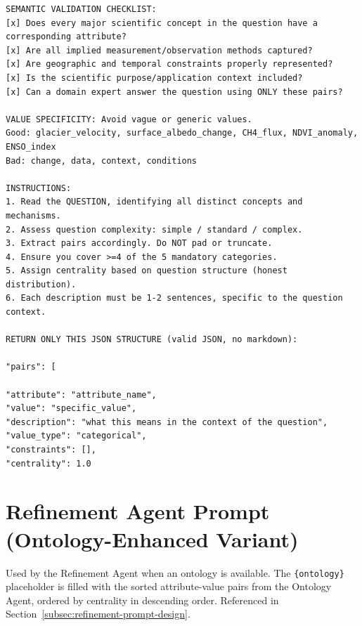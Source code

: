 \begin{lstlisting}[style=promptstyle,
caption={Ontology Agent extraction prompt (full).},
label={lst:ontology-prompt}]
SEMANTIC VALIDATION CHECKLIST:
[x] Does every major scientific concept in the question have a corresponding attribute?
[x] Are all implied measurement/observation methods captured?
[x] Are geographic and temporal constraints properly represented?
[x] Is the scientific purpose/application context included?
[x] Can a domain expert answer the question using ONLY these pairs?

VALUE SPECIFICITY: Avoid vague or generic values.
Good: glacier_velocity, surface_albedo_change, CH4_flux, NDVI_anomaly, ENSO_index
Bad: change, data, context, conditions

INSTRUCTIONS:
1. Read the QUESTION, identifying all distinct concepts and mechanisms.
2. Assess question complexity: simple / standard / complex.
3. Extract pairs accordingly. Do NOT pad or truncate.
4. Ensure you cover >=4 of the 5 mandatory categories.
5. Assign centrality based on question structure (honest distribution).
6. Each description must be 1-2 sentences, specific to the question context.

RETURN ONLY THIS JSON STRUCTURE (valid JSON, no markdown):

"pairs": [

"attribute": "attribute_name",
"value": "specific_value",
"description": "what this means in the context of the question",
"value_type": "categorical",
"constraints": [],
"centrality": 1.0

\end{lstlisting}

\section{Refinement Agent Prompt (Ontology-Enhanced Variant)}\label{app:prompt-refinement}

Used by the Refinement Agent when an ontology is available. The \texttt{\{ontology\}} placeholder
is filled with the sorted attribute-value pairs from the Ontology Agent, ordered by centrality
in descending order. Referenced in Section~\ref{subsec:refinement-prompt-design}.

